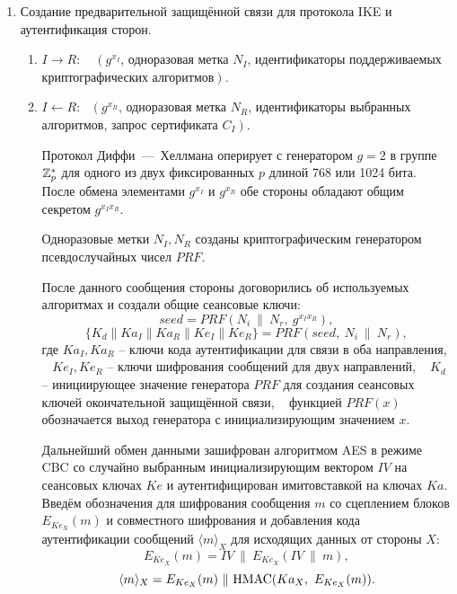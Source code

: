 \begin{enumerate}
    \item Создание предварительной защищённой связи для протокола IKE и аутентификация сторон.
        \begin{enumerate}
            \item $I \rightarrow R$: ~ $\left(g^{x_I}\right.$, одноразовая метка $N_I$, идентификаторы поддерживаемых криптографических алгоритмов$\left.\right)$.

            \item $I \leftarrow R$: ~$\left(g^{x_R}\right.$, одноразовая метка $N_R$, идентификаторы выбранных алгоритмов, запрос сертификата $C_I\left.\right)$.

                Протокол Диффи~---~Хеллмана оперирует с генератором $g=2$ в группе $\mathbb{Z}_p^*$ для одного из двух фиксированных $p$ длиной 768 или 1024 бита. После обмена элементами $g^{x_I}$ и $g^{x_R}$ обе стороны обладают общим секретом $g^{x_I x_R}$.

                Одноразовые метки $N_I, N_R$ созданы криптографическим генератором псевдослучайных чисел $PRF$.

                После данного сообщения стороны договорились об используемых алгоритмах и создали общие сеансовые ключи:
                    \[ seed = PRF(N_i ~\|~ N_r, ~g^{x_I x_R}), \]
                    \[ \{ K_d \| Ka_I \| Ka_R \| Ke_I \| Ke_R
                        \} = PRF(seed, ~ N_i ~\|~ N_r), \]
                где $Ka_I, Ka_R$ -- ключи кода аутентификации для связи в оба направления, ~ $Ke_I, Ke_R$ -- ключи шифрования сообщений для двух направлений, ~ $K_d$ -- инициирующее значение генератора $PRF$ для создания сеансовых ключей окончательной защищённой связи, ~ функцией $PRF(x)$ обозначается выход генератора с инициализирующим значением $x$.

                Дальнейший обмен данными зашифрован алгоритмом AES в режиме CBC со случайно выбранным инициализирующим вектором $IV$ на сеансовых ключах $Ke$  и аутентифицирован имитовставкой на ключах $Ka$. Введём обозначения для шифрования сообщения $m$ со сцеплением блоков $E_{Ke_X}(m)$ и совместного шифрования и добавления кода аутентификации сообщений $\langle m \rangle_X$ для исходящих данных от стороны $X$:
                    \[  E_{Ke_X}(m) = IV ~\|~ E_{Ke_X}(IV ~\|~ m), \]
                    \[  \langle m \rangle_X = E_{Ke_X}(m) ~\|~ \textrm{HMAC}(Ka_X, ~ E_{Ke_X}(m)). \]


\end{enumerate}
\end{enumerate}
